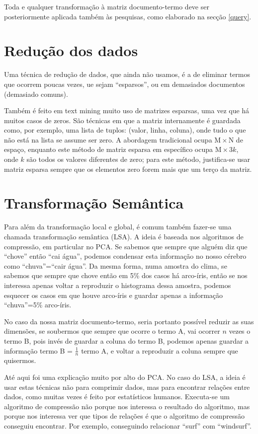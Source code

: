 \documentclass[twocolumn]{article}
\begin{document}
Toda e qualquer transformação à matriz documento-termo deve ser posteriormente aplicada também às pesquisas, como elaborado na secção \ref{query}.

\section{Redução dos dados}

Uma técnica de redução de dados, que ainda não usamos, é a de eliminar termos que ocorrem poucas vezes, ue sejam ``esparsos'', ou em demasiados documentos (demasiado comuns).

Também é feito em text mining muito uso de matrizes esparsas, uma vez que há muitos casos de zeros. São técnicas em que a matriz internamente é guardada como, por exemplo, uma lista de tuplos: (valor, linha, coluna), onde tudo o que não está na lista se assume ser zero. A abordagem tradicional ocupa $\mathrm{M}\times\mathrm{N}$ de espaço, enquanto este método de matriz esparsa em específico ocupa $\mathrm{M}\times3k$, onde $k$ são todos os valores diferentes de zero; para este método, justifica-se usar matriz esparsa sempre que os elementos zero forem mais que um terço da matriz.

\section{Transformação Semântica}
\label{semantica}

Para além da transformação local e global, é comum também fazer-se uma chamada transformação semântica (LSA). A ideia é baseada nos algoritmos de compressão, em particular no PCA. Se sabemos que sempre que alguém diz que ``chove'' então ``cai água'', podemos condensar esta informação no nosso cérebro como ``chuva''=``cair água''. Da mesma forma, numa amostra do clima, se sabemos que sempre que chove então em 5\% dos casos há arco-íris, então se nos interessa apenas voltar a reproduzir o histograma dessa amostra, podemos esquecer os casos em que houve arco-íris e guardar apenas a informação ``chuva''=5\% arco-íris.

No caso da nossa matriz documento-termo, seria portanto possível reduzir as suas dimensões, se soubermos que sempre que ocorre o termo A, vai ocorrer $n$ vezes o termo B, pois invés de guardar a coluna do termo B, podemos apenas guardar a informação termo B = $\frac{1}{n}$ termo A, e voltar a reproduzir a coluna sempre que quisermos.

Até aqui foi uma explicação muito por alto do PCA. No caso do LSA, a ideia é usar estas técnicas não para comprimir dados, mas para encontrar relações entre dados, como muitas vezes é feito por estatísticos humanos. Executa-se um algoritmo de compressão não porque nos interessa o resultado do algoritmo, mas porque nos interessa ver que tipos de relações é que o algoritmo de compressão conseguiu encontrar. Por exemplo, conseguindo relacionar ``surf'' com ``windsurf''.
\end{document}
